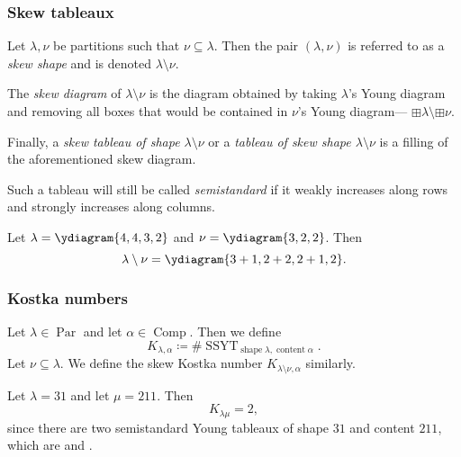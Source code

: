 \documentclass{article}
\DeclareMathOperator{\shape}{shape}
\DeclareMathOperator{\content}{content}
\DeclareMathOperator{\Par}{Par}
\DeclareMathOperator{\Com}{Comp}
\DeclareMathOperator{\SSYT}{SSYT}
\begin{document}
\subsubsection{Skew tableaux}

\begin{definition}
    Let $\lambda, \nu$ be partitions such that $\nu \subseteq \lambda$. Then the pair $(\lambda, \nu)$ is referred to as a \textit{skew shape} and is denoted $\lambda \setminus \nu$.

    The \textit{skew diagram} of $\lambda \setminus \nu$ is the diagram obtained by taking $\lambda$'s Young diagram and removing all boxes that would be contained in $\nu$'s Young diagram--- $\boxplus \lambda \setminus \boxplus \nu$.

    Finally, a \textit{skew tableau of shape $\lambda \setminus \nu$} or a \textit{tableau of skew shape $\lambda \setminus \nu$} is a filling of the aforementioned skew diagram. 

    Such a tableau will still be called \textit{semistandard} if it weakly increases along rows and strongly increases along columns.
\end{definition}

\begin{example} 
    \ytabsmallbox
    Let $\lambda = \ydiagram{4,4,3,2}$ and $\nu = \ydiagram{3,2,2}$.
    Then 
    \ytabnormalbox
    \[\lambda \setminus \nu = \ydiagram{3+1,2+2,2+1,2}.\]
\end{example}

\subsubsection{Kostka numbers}

\begin{definition}
    Let $\lambda \in \Par$ and let $\alpha \in \Com$.
    Then we define
    \[
        K_{\lambda,\alpha} \coloneq \#\SSYT_{\shape \lambda, \content \alpha}.
    \]
    Let $\nu \subseteq \lambda$. We define the skew Kostka number $K_{\lambda\setminus\nu,\alpha}$ similarly.
\end{definition}

\begin{example}
    Let $\lambda = 31$ and let $\mu = 211$.
    Then
    \[
        K_{\lambda\mu} = 2,
    \]
    since there are two semistandard Young tableaux of shape $31$ and content $211$, which are \ytabsmallbox{} and .
\end{example}
\end{document}
